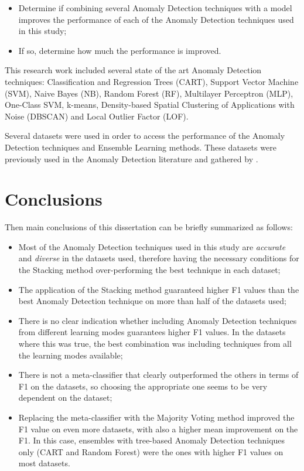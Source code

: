 \documentclass[9pt,a4paper]{extarticle}
\begin{document}
\begin{multicols}{2}
\begin{itemize}
	\item Determine if combining several Anomaly Detection techniques with a model improves the
	performance of each of the Anomaly Detection techniques used in this study;
	\item If so, determine how much the performance is improved.
\end{itemize}

This research work included several state of the art Anomaly Detection techniques:  Classification and Regression Trees (CART),  Support Vector Machine (SVM), Naive Bayes (NB),  Random Forest (RF), Multilayer Perceptron (MLP), One-Class SVM, k-means, Density-based Spatial Clustering of Applications with Noise (DBSCAN) and Local Outlier Factor (LOF).

Several datasets were used in order to access the performance of the Anomaly Detection techniques and Ensemble Learning methods.
These datasets were previously used in the Anomaly Detection literature and gathered by \textcite{Campos2016}.

\section{Conclusions}\label{sec:conclui}

Then main conclusions of this dissertation can be briefly summarized as follows:

\begin{itemize}	
	\item Most of the Anomaly Detection techniques used in this study are \textit{accurate} and \textit{diverse} in the datasets used, therefore having the necessary conditions for the Stacking method over-performing the best technique in each dataset;
	\item The application of the Stacking method guaranteed higher F1 values than the best Anomaly Detection technique on more than half of the datasets used;
	\item There is no clear indication whether including Anomaly Detection techniques from different learning modes guarantees higher F1 values. In the datasets where this was true, the best combination was including techniques from all the learning modes available;
	\item There is not a meta-classifier that clearly outperformed the others in terms of F1 on the datasets, so choosing the appropriate one seems to be very dependent on the dataset;
	\item Replacing the meta-classifier with the Majority Voting method improved the F1 value on even more datasets, with also a higher mean improvement on the F1. In this case, ensembles with tree-based Anomaly Detection techniques only (CART and Random Forest) were the ones with higher F1 values on most datasets.
\end{itemize}


%
\printbibliography

\end{multicols}
\end{document}

